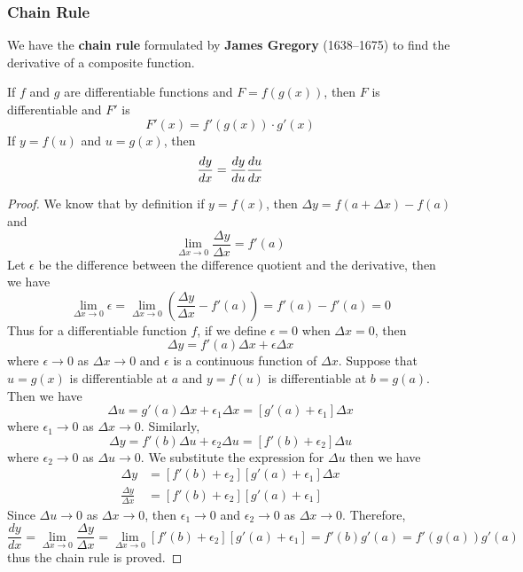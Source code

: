 \subsubsection{Chain Rule}
We have the \textbf{chain rule} formulated by \textbf{James Gregory}
(1638--1675) to find the derivative of a composite function.
\begin{theorem}
    If \(f\) and \(g\) are differentiable functions and \(F=f(g(x))\),
    then \(F\) is differentiable and \(F'\) is
    \[F'(x)=f'(g(x))\cdot g'(x)\]
    If \(y=f(u)\) and \(u=g(x)\), then
    \[\frac{dy}{dx}=\frac{dy}{du}\frac{du}{dx}\qedhere\]
\end{theorem}
\begin{proof}
    We know that by definition if \(y=f(x)\),
    then \(\Delta y=f(a+\Delta x)-f(a)\) and
    \[\lim_{\Delta x\to 0}\frac{\Delta y}{\Delta x}=f'(a)\]
    Let \(\epsilon\) be the difference between the difference quotient and the
    derivative, then we have
    \[\lim_{\Delta x\to 0}\epsilon
    =\lim_{\Delta x\to 0}\left(\frac{\Delta y}{\Delta x}-f'(a)\right)
    =f'(a)-f'(a)=0\]
    Thus for a differentiable function \(f\), if we define \(\epsilon=0\)
    when \(\Delta x=0\), then \[\Delta y=f'(a)\Delta x+\epsilon\Delta x\]
    where \(\epsilon\to 0\) as \(\Delta x\to 0\) and \(\epsilon\) is a
    continuous function of \(\Delta x\).
    Suppose that \(u=g(x)\) is differentiable at \(a\) and \(y=f(u)\) is
    differentiable at \(b=g(a)\).
    Then we have
    \[\Delta u=g'(a)\Delta x+\epsilon_1\Delta x=[g'(a)+\epsilon_1]\Delta x\]
    where \(\epsilon_1\to 0\) as \(\Delta x\to 0\).
    Similarly, \[\Delta y=f'(b)\Delta u+\epsilon_2\Delta u=[f'(b)+\epsilon_2]\Delta u\]
    where \(\epsilon_2\to 0\) as \(\Delta u\to 0\).
    We substitute the expression for \(\Delta u\) then we have
    \begin{align*}
        \Delta y &= [f'(b)+\epsilon_2][g'(a)+\epsilon_1]\Delta x \\
        \frac{\Delta y}{\Delta x} &= [f'(b)+\epsilon_2][g'(a)+\epsilon_1]
    \end{align*}
    Since \(\Delta u\to 0\) as \(\Delta x\to 0\), then \(\epsilon_1\to 0\) and
    \(\epsilon_2 \to 0\) as \(\Delta x\to 0\).
    Therefore,
    \[\frac{dy}{dx}=\lim_{\Delta x\to 0}\frac{\Delta y}{\Delta x}
    =\lim_{\Delta x\to 0}[f'(b)+\epsilon_2][g'(a)+\epsilon_1]
    =f'(b)g'(a)=f'(g(a))g'(a)\]
    thus the chain rule is proved.
\end{proof}